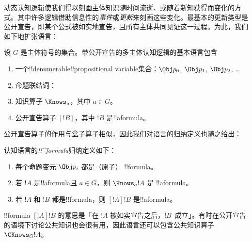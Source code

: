 \documentclass[../../../include/open-logic-section]{subfiles}
\begin{document}


动态认知逻辑使我们得以刻画主体知识随时间流逝、或随着新知获得而变化的方式。其中许多逻辑借助信息性的\emph{事件}或\emph{更新}来刻画这些变化。最基本的更新类型是公开宣告，即某个公式被如实地宣告，且所有主体共同见证这一过程。为此，我们如下地扩张语言：

\begin{defn}
设 $G$ 是主体符号的集合。带公开宣告的多主体认知逻辑的基本语言包含
\begin{enumerate}
  \item 一个!!{denumerable}!!{propositional variable}集合：$\Obj
    p_0$, $\Obj p_1$, $\Obj p_2$, \dots
  \item 命题联结词：\startycommalist
  \item 知识算子 $\Knows_a$，其中 $a \in G$。
  \item 公开宣告算子 $[!B]$，其中 $!B$ 是!!a{formula}。
\end{enumerate}
\end{defn}

公开宣告算子的作用与盒子算子相似，因此我们对语言的归纳定义也随之给出：

\begin{defn}
  认知语言的\emph{!!^{formula}}归纳定义如下：
  \begin{enumerate}


  \item 每个命题变元 $\Obj p_i$ 都是（原子）
  !!{formula}。






  \item 若 $!A$ 是!!a{formula}且 $a \in G$，则 $\Knows_a !A$ 是
  !!a{formula}。

  \item 若 $!A$ 和 $!B$ 都是!!{formula}，则 $[!A] !B$ 是!!a{formula}。

\end{enumerate}
\end{defn}

!!{formula} $[!A] !B$ 的意思是「在 $!A$ 被如实宣告之后，$!B$~成立」。有时在公开宣告的语境下讨论公共知识也会很有用，因此语言还可以包含公共知识算子~$\CKnows_G !A$。
\end{document}

